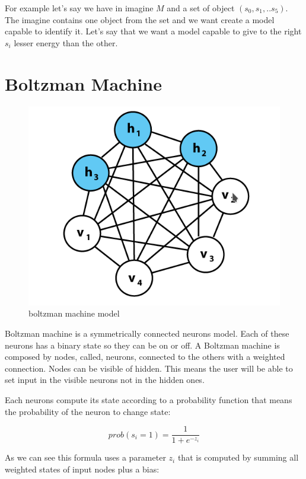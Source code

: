  For example let's say we have in imagine $M$ and a set of object $(s_0, s_1,.. s_5)$. The imagine contains one object from the set and we want create a model capable to identify it. Let's say that we want a model capable to give to the right $s_i$ lesser energy than the other.
 
 \section{Boltzman Machine}
 \begin{figure}
  \centering
    \includegraphics[scale=0.65]{img/boltzmanMachine.png}
    \caption{boltzman machine model}
    \label{img:bolzman_machine}
 \end{figure}
 Boltzman machine is a symmetrically  connected neurons model. Each of these neurons has a binary state so they can be on or off.
 A Boltzman machine is composed by nodes, called, neurons, connected to the others with a weighted connection. Nodes can be visible of hidden. This means the user will be able to set input in the visible neurons not in the hidden ones.
 
 Each neurons compute its state according to a probability function that means the probability of the neuron to change state:
 
 \begin{equation}
 prob(s_i = 1) = \frac{1}{1 + e^{-z_i}}
 \end{equation}
 
 As we can see this formula uses a parameter $z_i$ that is computed by summing all weighted states of input nodes plus a bias:
 
